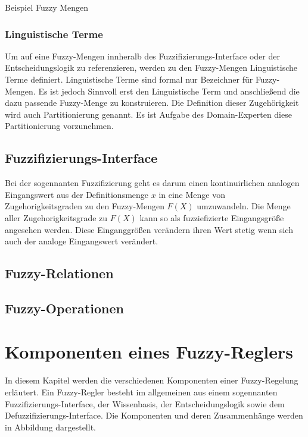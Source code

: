 \documentclass[12pt,a4paper,bibliography=totocnumbered,listof=totocnumbered]{scrartcl}
\begin{document}
Beispiel Fuzzy Mengen

\subsubsection{Linguistische Terme}

Um auf eine Fuzzy-Mengen innheralb des Fuzzifizierungs-Interface oder der Entscheidungslogik zu referenzieren, werden zu den Fuzzy-Mengen Linguistische Terme definiert. Linguistische Terme sind formal nur Bezeichner für Fuzzy-Mengen. Es ist jedoch Sinnvoll erst den Linguistische Term und anschließend die dazu passende Fuzzy-Menge zu konstruieren. Die Definition dieser Zugehörigkeit wird auch Partitionierung genannt. Es ist Aufgabe des Domain-Experten diese Partitionierung vorzunehmen.



\subsection{Fuzzifizierungs-Interface}

Bei der sogennanten Fuzzifizierung geht es darum einen kontinuirlichen analogen Eingangswert aus der Definitionsmenge $x$ in eine Menge von Zugehorigkeitsgraden zu den Fuzzy-Mengen $F(X)$ umzuwandeln. Die Menge aller Zugehorigkeitsgrade zu $F(X)$ kann so als fuzziefizierte Eingangsgröße angesehen werden. Diese Einganggrößen verändern ihren Wert stetig wenn sich auch der analoge Eingangswert verändert. 

\subsection{Fuzzy-Relationen}

\subsection{Fuzzy-Operationen}

\section{Komponenten eines Fuzzy-Reglers}

In diesem Kapitel werden die verschiedenen Komponenten einer Fuzzy-Regelung erläutert. Ein Fuzzy-Regler besteht im allgemeinen aus einem sogennanten Fuzzifizierungs-Interface, der Wissenbasis, der Entscheidungslogik sowie dem Defuzzifizierungs-Interface. Die Komponenten und deren Zusammenhänge werden in Abbildung dargestellt.
\end{document}
